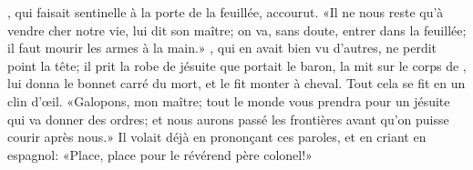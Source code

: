, qui faisait sentinelle à la porte de la feuillée, accourut. «Il
ne nous reste qu’à vendre cher notre vie, lui dit son maître; on va,
sans doute, entrer dans la feuillée; il faut mourir les armes à la
main.» , qui en avait bien vu d’autres, ne perdit point la tête;
il prit la robe de jésuite que portait le baron, la mit sur le corps de
, lui donna le bonnet carré du mort, et le fit monter à cheval.
Tout cela se fit en un clin d’œil. «Galopons, mon maître; tout le monde
vous prendra pour un jésuite qui va donner des ordres; et nous aurons
passé les frontières avant qu’on puisse courir après nous.» Il volait
déjà en prononçant ces paroles, et en criant en espagnol: «Place, place
pour le révérend père colonel!»

\endinput



